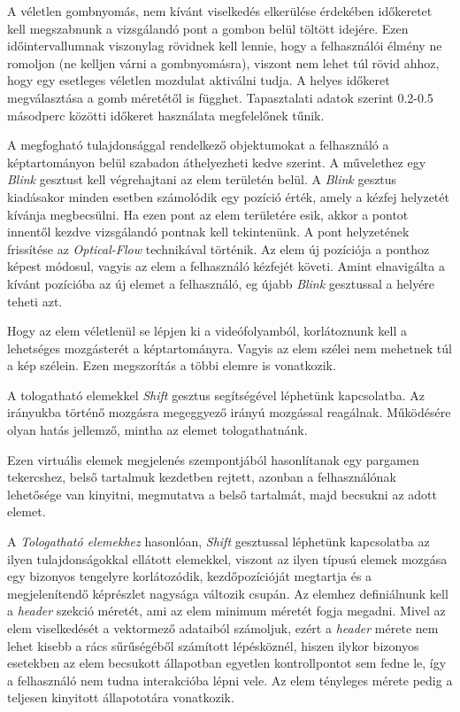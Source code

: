 A véletlen gombnyomás, nem kívánt viselkedés elkerülése érdekében időkeretet kell megszabnunk a vizsgálandó pont a gombon belül töltött idejére. Ezen időintervallumnak viszonylag rövidnek kell lennie, hogy a felhasználói élmény ne romoljon (ne kelljen várni a gombnyomásra), viszont nem lehet túl rövid ahhoz, hogy egy esetleges véletlen mozdulat aktiválni tudja. A helyes időkeret megválasztása a gomb méretétől is függhet. Tapasztalati adatok szerint 0.2-0.5 másodperc közötti időkeret használata megfelelőnek tűnik.


A megfogható tulajdonsággal rendelkező objektumokat a felhasználó a képtartományon belül szabadon áthelyezheti kedve szerint. A művelethez egy \textit{Blink} gesztust kell végrehajtani az elem területén belül. A \textit{Blink} gesztus kiadásakor minden esetben számolódik egy pozíció érték, amely a kézfej helyzetét kívánja megbecsülni. Ha ezen pont az elem területére esik, akkor a pontot innentől kezdve vizsgálandó pontnak kell tekintenünk. A pont helyzetének frissítése az \textit{Optical-Flow} technikával történik. Az elem új pozíciója a ponthoz képest módosul, vagyis az elem a felhasználó kézfejét követi.
Amint elnavigálta a kívánt pozícióba az új elemet a felhasználó, eg újabb \textit{Blink} gesztussal a helyére teheti azt.

Hogy az elem véletlenül se lépjen ki a videófolyamból, korlátoznunk kell a lehetséges mozgásterét a képtartományra. Vagyis az elem szélei nem mehetnek túl a kép szélein. Ezen megszorítás a többi elemre is vonatkozik.


A tologatható elemekkel \textit{Shift} gesztus segítségével léphetünk kapcsolatba. Az irányukba történő mozgásra megeggyező irányú mozgással reagálnak. Működésére olyan hatás jellemző, mintha az elemet tologathatnánk.


Ezen virtuális elemek megjelenés szempontjából hasonlítanak egy pargamen tekercshez, belső tartalmuk kezdetben rejtett, azonban a felhasználónak lehetősége van kinyitni, megmutatva a belső tartalmát, majd becsukni az adott elemet.

A \textit{Tologatható elemekhez} hasonlóan, \textit{Shift} gesztussal léphetünk kapcsolatba az ilyen tulajdonságokkal ellátott elemekkel, viszont az ilyen típusú elemek mozgása egy bizonyos tengelyre korlátozódik, kezdőpozícióját megtartja és a megjelenítendő képrészlet nagysága változik csupán. Az elemhez definiálnunk kell a \textit{header} szekció méretét, ami az elem minimum méretét fogja megadni. Mivel az elem viselkedését a vektormező adataiból számoljuk, ezért a \textit{header} mérete nem lehet kisebb a rács sűrűségéből számított lépésköznél, hiszen ilykor bizonyos esetekben az elem becsukott állapotban egyetlen kontrollpontot sem fedne le, így a felhasználó nem tudna interakcióba lépni vele.
Az elem tényleges mérete pedig a teljesen kinyitott állapototára vonatkozik.

